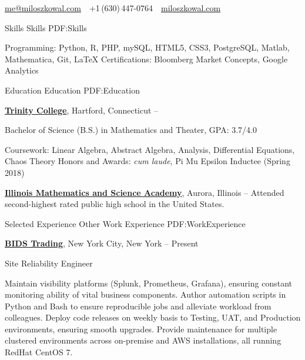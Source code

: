\documentclass[letterpaper,MMMyyyy,nonstopmode]{simpleresumecv}
\newcommand{\CVAuthor}{Milosz Kowal}
\newcommand{\CVWebpage}{https://miloszkowal.com}
\begin{document}

\Title{\CVAuthor}

\begin{SubTitle}
\par
\href{mailto:me@miloszkowal.com}
{me@miloszkowal.com}
\,\SubBulletSymbol\,
+1\,(630)\,447-0764
\,\SubBulletSymbol\,
\href{\CVWebpage}
{miloszkowal.com}
\end{SubTitle}

\begin{Body}


\Section
{Skills}
{Skills}
{PDF:Skills}

\Entry
Programming: Python, R, PHP, mySQL, HTML5, CSS3, PostgreSQL, Matlab, Mathematica, Git, \LaTeX{} \hfill\break{}
Certifications: Bloomberg Market Concepts, Google Analytics


\hrulefill
\Section
{Education}
{Education}
{PDF:Education}

\Entry
\href{http://www.trincoll.edu}
{\textbf{Trinity College}},
Hartford, Connecticut
\hfill
{} --

\Gap
\BulletItem
Bachelor of Science (B.S.) in
Mathematics and Theater, GPA: 3.7/4.0
\begin{Detail}
\SubBulletItem
Coursework: Linear Algebra, Abstract Algebra, Analysis, Differential Equations, Chaos Theory
\SubBulletItem
Honors and Awards: \textit{cum laude}, Pi Mu Epsilon Inductee (Spring 2018)
\end{Detail}

\BigGap
\Entry
\href{http://www.imsa.edu}
{\textbf{Illinois Mathematics and Science Academy}},
Aurora, Illinois
\hfill
{} --
\Gap
\BulletItem
Attended second-highest rated public high school in the United States.


\hrulefill
\Section
{Selected\newline
Experience}
{Other Work Experience}
{PDF:WorkExperience}

\Entry
\href{https://www.bidstrading.com/}
{\textbf{BIDS Trading}},
New York City, New York
\hfill
{} --
Present

\Gap
\BulletItem
Site Reliability Engineer
\begin{Detail}
\SubBulletItem
Maintain visibility platforms (Splunk, Prometheus, Grafana), ensuring constant monitoring ability of vital business components.
\SubBulletItem
Author automation scripts in Python and Bash to ensure reproducible jobs and alleviate workload from colleagues. 
\SubBulletItem
Deploy code releases on weekly basis to Testing, UAT, and Production environments, ensuring smooth upgrades.
\SubBulletItem
Provide maintenance for multiple clustered environments across on-premise and AWS installations, all running RedHat CentOS 7.
\end{Detail}


\end{Body}
\end{document}
